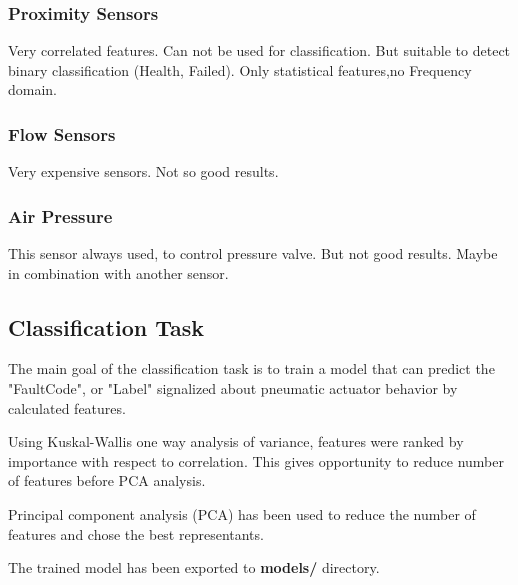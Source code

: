 \documentclass[class=article, crop=false]{standalone}
\begin{document}
\subsubsection{Proximity Sensors}
Very correlated features. Can not be used for classification. But suitable
to detect binary classification (Health, Failed).
Only statistical features,no Frequency domain.

\subsubsection{Flow Sensors}
Very expensive sensors. Not so good results.

\subsubsection{Air Pressure}
This sensor always used, to control pressure valve. But not good results.
Maybe in combination with another sensor.

\subsection{Classification Task}

The main goal of the classification task is to train a model that can
predict the "FaultCode", or "Label" signalized about pneumatic actuator behavior by
calculated features.

Using Kuskal-Wallis one way analysis of variance, features were ranked by
importance with respect to correlation. This gives opportunity to reduce
number of features before PCA analysis.

Principal component analysis (PCA) has been used to reduce the number of
features and chose the best representants.

The trained model has been exported to
\textbf{models/} directory.
\end{document}
